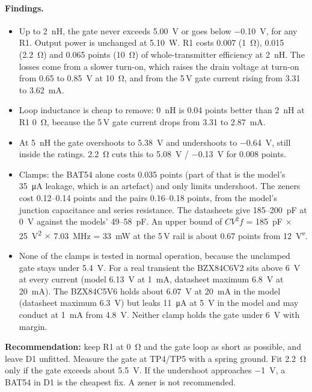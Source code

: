 \documentclass[11pt,letterpaper]{article}
\newcommand{\est}{\textsuperscript{e}}
\begin{document}
\paragraph{Findings.}
\begin{itemize}[nosep]
\item Up to \SI{2}{\nano\henry}, the gate never exceeds \SI{5.00}{\volt} or goes below \SI{-0.10}{\volt}, for any R1. Output power is unchanged at \SI{5.10}{\watt}. R1 costs 0.007 (\SI{1}{\ohm}), 0.015 (\SI{2.2}{\ohm}) and 0.065 points (\SI{10}{\ohm}) of whole-transmitter efficiency at \SI{2}{\nano\henry}. The losses come from a slower turn-on, which raises the drain voltage at turn-on from 0.65 to \SI{0.85}{\volt} at \SI{10}{\ohm}, and from the 5\,V gate current rising from 3.31 to \SI{3.62}{\milli\ampere}.
\item Loop inductance is cheap to remove: \SI{0}{\nano\henry} is 0.04 points better than \SI{2}{\nano\henry} at R1 \SI{0}{\ohm}, because the 5\,V gate current drops from 3.31 to \SI{2.87}{\milli\ampere}.
\item At \SI{5}{\nano\henry} the gate overshoots to \SI{5.38}{\volt} and undershoots to \SI{-0.64}{\volt}, still inside the ratings. \SI{2.2}{\ohm} cuts this to \SI{5.08}{\volt} / \SI{-0.13}{\volt} for 0.008 points.
\item Clamps: the BAT54 alone costs 0.035 points (part of that is the model's \SI{35}{\micro\ampere} leakage, which is an artefact) and only limits undershoot. The zeners cost 0.12--0.14 points and the pairs 0.16--0.18 points, from the model's junction capacitance and series resistance. The datasheets give 185--\SI{200}{\pico\farad} at \SI{0}{\volt} against the models' 49--\SI{58}{\pico\farad}. An upper bound of $C V^2 f$ = \SI{185}{\pico\farad} $\times$ \SI{25}{\volt\squared} $\times$ \SI{7.03}{\mega\hertz} = \SI{33}{\milli\watt} at the 5\,V rail is about 0.67 points from \SI{12}{\volt}\est.
\item None of the clamps is tested in normal operation, because the unclamped gate stays under \SI{5.4}{\volt}. For a real transient the BZX84C6V2 sits above \SI{6}{\volt} at every current (model \SI{6.13}{\volt} at \SI{1}{\milli\ampere}, datasheet maximum \SI{6.8}{\volt} at \SI{20}{\milli\ampere}). The BZX84C5V6 holds about \SI{6.07}{\volt} at \SI{20}{\milli\ampere} in the model (datasheet maximum \SI{6.3}{\volt}) but leaks \SI{11}{\micro\ampere} at \SI{5}{\volt} in the model and may conduct at \SI{1}{\milli\ampere} from \SI{4.8}{\volt}. Neither clamp holds the gate under \SI{6}{\volt} with margin.
\end{itemize}
\textbf{Recommendation:} keep R1 at \SI{0}{\ohm} and the gate loop as short as possible, and leave D1 unfitted. Measure the gate at TP4/TP5 with a spring ground. Fit \SI{2.2}{\ohm} only if the gate exceeds about \SI{5.5}{\volt}. If the undershoot approaches \SI{-1}{\volt}, a BAT54 in D1 is the cheapest fix. A zener is not recommended.
\end{document}
